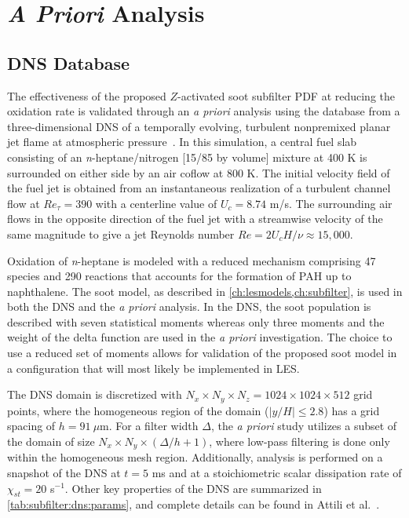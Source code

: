 \section{\textit{A Priori} Analysis}
\label{sec:subfilter:dns}

\subsection{DNS Database}
\label{sec:subfilter:dns:database}

The effectiveness of the proposed $Z$-activated soot subfilter PDF at reducing the oxidation rate is validated through an \textit{a priori} analysis using the database from a three-dimensional DNS of a temporally evolving, turbulent nonpremixed planar jet flame at atmospheric pressure~\cite{attili2014}. In this simulation, a central fuel slab consisting of an \textit{n}-heptane/nitrogen [15/85 by volume] mixture at 400 K is surrounded on either side by an air coflow at 800 K. The initial velocity field of the fuel jet is obtained from an instantaneous realization of a turbulent channel flow at $Re_{\tau} = 390$ with a centerline value of $U_c = 8.74$ m/s. The surrounding air flows in the opposite direction of the fuel jet with a streamwise velocity of the same magnitude to give a jet Reynolds number $Re = 2U_c H/\nu \approx 15,000$.

Oxidation of \textit{n}-heptane is modeled with a reduced mechanism comprising 47 species and 290 reactions that accounts for the formation of PAH up to naphthalene. The soot model, as described in \cref{ch:lesmodels,ch:subfilter}, is used in both the DNS and the \textit{a priori} analysis. In the DNS, the soot population is described with seven statistical moments whereas only three moments and the weight of the delta function are used in the \textit{a priori} investigation. The choice to use a reduced set of moments allows for validation of the proposed soot model in a configuration that will most likely be implemented in LES.

The DNS domain is discretized with $N_x \times N_y \times N_z = 1024 \times 1024 \times 512$ grid points, where the homogeneous region of the domain ($|y/H| \le 2.8$) has a grid spacing of $h = 91\ \mu$m. For a filter width $\Delta$, the \textit{a priori} study utilizes a subset of the domain of size $N_x \times N_y \times (\Delta/h + 1)$, where low-pass filtering is done only within the homogeneous mesh region. Additionally, analysis is performed on a snapshot of the DNS at $t = 5$ ms and at a stoichiometric scalar dissipation rate of $\chi_{st} = 20$ s$^{-1}$. Other key properties of the DNS are summarized in \cref{tab:subfilter:dns:params}, and complete details can be found in Attili et al.~\cite{attili2014}.

